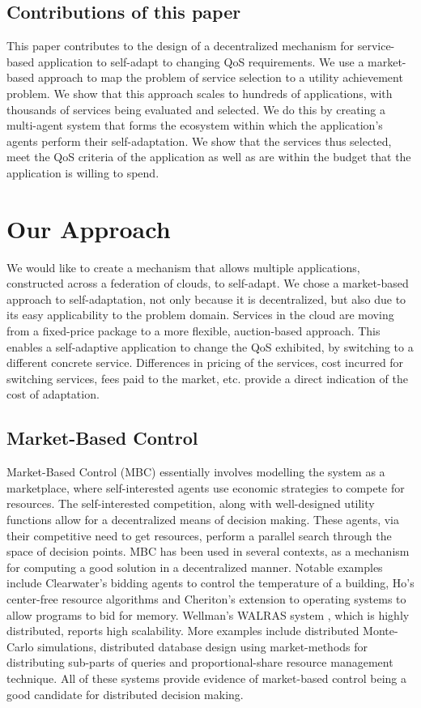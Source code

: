 \documentclass[10pt,journal,compsoc]{IEEEtran}
\begin{document}
\subsection{Contributions of this paper}
This paper contributes to the design of a decentralized mechanism for service-based application to self-adapt to changing QoS requirements. We use a market-based approach to map the problem of service selection to a utility achievement problem.  We show that this approach scales to hundreds of applications, with thousands of services being evaluated and selected. We do this by creating a multi-agent system that forms the ecosystem within which the application's agents perform their self-adaptation. We show that the services thus selected, meet the QoS criteria of the application as well as are within the budget that the application is willing to spend. 
  
\section{Our Approach}
We would like to create a mechanism that allows multiple applications, constructed across a federation of clouds, to self-adapt. We chose a market-based approach to self-adaptation, not only because it is decentralized, but also due to its easy applicability to the problem domain. Services in the cloud are moving from a fixed-price package to a more flexible, auction-based approach\cite{Amazon2010SpotInstance}. This enables a self-adaptive application to change the QoS exhibited, by switching to a different concrete service. Differences in pricing of the services, cost incurred for switching services, fees paid to the market, etc. provide a direct indication of the cost of adaptation. 
\subsection{Market-Based Control}
Market-Based Control (MBC) essentially involves modelling the system as a marketplace, where self-interested agents use economic strategies to compete for resources. The self-interested competition, along with well-designed utility functions allow for a decentralized means of decision making. These agents, via their competitive need to get resources, perform a parallel search through the space of decision points. MBC has been used in several contexts, as a mechanism for computing a good solution in a decentralized manner. Notable examples include Clearwater's bidding agents to control the temperature of a building\cite{Clearwater1996Saving}, Ho's center-free resource algorithms \cite{Ho1980class} and Cheriton's extension to operating systems to allow programs to bid for memory\cite{Harty1996market}. Wellman's WALRAS system \cite{Wellman1993market-oriented}, which is highly distributed, reports high scalability. More examples include distributed Monte-Carlo simulations\cite{Waldspurger1992Spawn}, distributed database design using market-methods for distributing sub-parts of queries \cite{Stonebraker1994Economic} and proportional-share resource management technique\cite{Waldspurger1994Lottery}. All of these systems provide evidence of market-based control being a good candidate for distributed decision making. 
\end{document}
